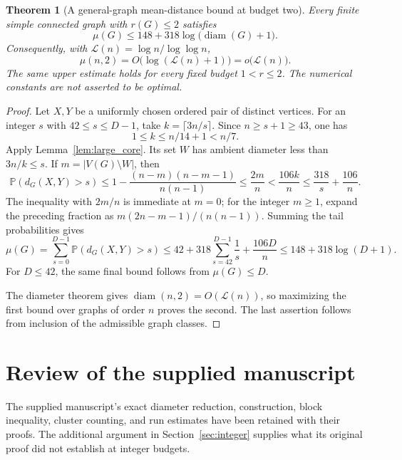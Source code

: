 \documentclass[11pt]{amsart}
\newtheorem{theorem}{Theorem}[section]
\theoremstyle{definition}
\theoremstyle{remark}
\begin{document}
\begin{theorem}[A general-graph mean-distance bound at budget two]\label{thm:meantwo}
Every finite simple connected graph with $r(G)\le2$ satisfies
\[
 \mu(G)\le148+318\log\bigl(\operatorname{diam}(G)+1\bigr).
\]
Consequently, with $\mathcal L(n)=\log n/\log\log n$,
\[
 \mu(n,2)=O\bigl(\log(\mathcal L(n)+1)\bigr)
          =o\bigl(\mathcal L(n)\bigr).
\]
The same upper estimate holds for every fixed budget $1<r\le2$.
The numerical constants are not asserted to be optimal.
\end{theorem}
\begin{proof}
Let $X,Y$ be a uniformly chosen ordered pair of distinct vertices.
For an integer $s$ with $42\le s\le D-1$, take
$k=\lceil3n/s\rceil$. Since $n\ge s+1\ge43$, one has
\[
 1\le k\le n/14+1<n/7.
\]
Apply Lemma~\ref{lem:large_core}. Its set $W$ has ambient diameter
less than $3n/k\le s$. If $m=|V(G)\setminus W|$, then
\[
 \mathbb P(d_G(X,Y)>s)
 \le1-\frac{(n-m)(n-m-1)}{n(n-1)}
 \le\frac{2m}{n}
 <\frac{106k}{n}
 \le\frac{318}{s}+\frac{106}{n}.
\]
The inequality with $2m/n$ is immediate at $m=0$; for the integer
$m\ge1$, expand the preceding fraction as
$m(2n-m-1)/(n(n-1))$.
Summing the tail probabilities gives
\[
 \mu(G)=\sum_{s=0}^{D-1}\mathbb P(d_G(X,Y)>s)
 \le42+318\sum_{s=42}^{D-1}\frac1s+\frac{106D}{n}
 \le148+318\log(D+1).
\]
For $D\le42$, the same final bound follows from $\mu(G)\le D$.

The diameter theorem gives $\operatorname{diam}(n,2)=O(\mathcal L(n))$,
so maximizing the first bound over graphs of order $n$ proves the second.
The last assertion follows from inclusion of the admissible graph classes.
\end{proof}

\section{Review of the supplied manuscript}\label{sec:audit}
The supplied manuscript's exact diameter reduction, construction,
block inequality, cluster counting, and run estimates have been retained
with their proofs. The additional argument in Section~\ref{sec:integer}
supplies what its original proof did not establish at integer budgets.
\end{document}
